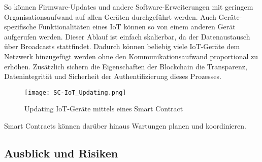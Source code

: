 So können Firmware-Updates und andere Software-Erweiterungen mit geringem Organisationsaufwand auf allen 
Geräten durchgeführt werden. 
Auch Geräte-spezifische Funktionalitäten eines IoT können so von einem anderen Gerät aufgerufen werden.
Dieser Ablauf ist einfach skalierbar, da der Datenaustausch über Broadcasts stattfindet.  
Dadurch können beliebig viele IoT-Geräte dem Netzwerk hinzugefügt werden ohne den Kommunikationsaufwand 
proportional zu erhöhen. 
Zusätzlich sichern die Eigenschaften der Blockchain die Transparenz, Datenintegrität und Sicherheit der
Authentifizierung dieses Prozesses.
\cite[p.~74f]{Choi2018DeviceControl}

\begin{figure}[!h]
    \begin{center}
        \texttt{[image: SC-IoT\_Updating.png]}
    \end{center}
    \caption{Updating IoT-Geräte mittels eines Smart Contract}
    \label{fig:SC-IoT_Update}
\end{figure}


Smart Contracts können darüber hinaus Wartungen planen und koordinieren.


\cite[p.~171]{chowdhary2025smart}




\subsection{Ausblick und Risiken}

